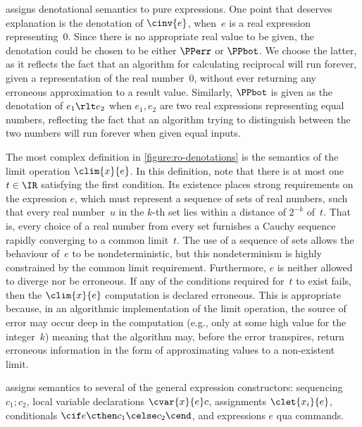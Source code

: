  assigns denotational semantics to pure expressions.
One point that deserves explanation is the denotation of $\cinv{e}$, when~$e$ is a real expression representing~$0$. Since there is no appropriate real value to be given, the denotation could be chosen to be 
either $\PPerr$ or $\PPbot$. We choose the latter, as it reflects the fact that an algorithm for calculating reciprocal will run forever, given a representation of the real number~$0$, without ever returning any erroneous approximation to a result value.
Similarly, $\PPbot$ is given as the denotation of  $e_1 \rlt e_2$ when $e_1,e_2$ are two real expressions representing equal numbers, reflecting the fact that an algorithm trying to distinguish between the two numbers will run forever when given equal inputs.

The most complex definition in \cref{figure:ro-denotations} is the semantics of the  limit operation $\clim{x}{e}$.
%
In this definition, note that there is at most one $t \in \IR$ satisfying the first condition.
Its existence places strong requirements on the expression $e$, which must represent a sequence of sets of real numbers, such that every real number~$u$ in the $k$-th set lies within a distance of $2^{-k}$ of~$t$.
That is, every choice of a real number from every set furnishes a Cauchy sequence rapidly converging to a common limit~$t$.
The use of a sequence of sets allows the behaviour of~$e$ to be nondeterministic, but this nondeterminism is highly constrained by the common limit requirement. Furthermore, $e$ is neither allowed to diverge nor be erroneous. If any of the conditions required for~$t$ to exist fails, then the $\clim{x}{e}$ computation is declared erroneous.
This is appropriate because, in an algorithmic implementation of the limit operation, the source of error may occur deep in the computation (e.g., only at some high value for the integer~$k$) meaning that the algorithm may, before the error transpires, return erroneous information in the form of approximating values to a non-existent limit.

 assigns semantics to
several of the general expression  constructors: sequencing $c_1 ; c_2$,
local variable declarations $\cvar{x}{e} c$,
assignments $\clet{x_{i}}{e}$,
conditionals $\cif e \cthen c_1 \celse c_2 \cend$, and expressions $e$ qua commands.

